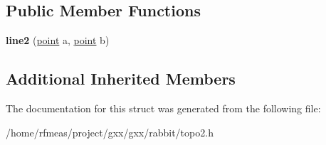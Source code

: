 \subsection*{Public Member Functions}
\begin{DoxyCompactItemize}
\item 
{\bfseries line2} (\hyperlink{classmalgo_1_1vector2}{point} a, \hyperlink{classmalgo_1_1vector2}{point} b)\hypertarget{structrabbit_1_1line2_a5203ab9f11877533ef8c989ad4c30de7}{}\label{structrabbit_1_1line2_a5203ab9f11877533ef8c989ad4c30de7}

\end{DoxyCompactItemize}
\subsection*{Additional Inherited Members}


The documentation for this struct was generated from the following file\+:\begin{DoxyCompactItemize}
\item 
/home/rfmeas/project/gxx/gxx/rabbit/topo2.\+h\end{DoxyCompactItemize}
